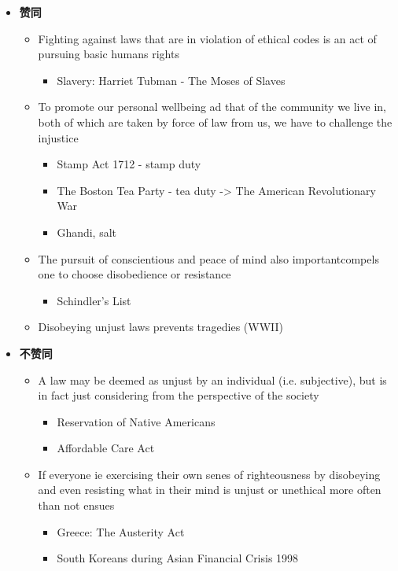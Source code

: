 \documentclass{article}
\begin{document}
  \begin{itemize}
    \item \textbf{赞同}
    \begin{itemize}
      \item Fighting against laws that are in violation of ethical codes
      is an act of pursuing basic humans rights
      \begin{itemize}
        \item Slavery: Harriet Tubman - The Moses of Slaves
      \end{itemize}

      \item To promote our personal wellbeing ad that of the community we
      live in, both of which are taken by force of law from us, we have to
      challenge the injustice
      \begin{itemize}
        \item Stamp Act 1712 - stamp duty
        \item The Boston Tea Party - tea duty -> The American
        Revolutionary War
        \item Ghandi, salt
      \end{itemize}

      \item The pursuit of conscientious and peace of mind also
      important{compels one to choose disobedience or resistance}
      \begin{itemize}
        \item Schindler’s List
      \end{itemize}

      \item Disobeying unjust laws prevents tragedies (WWII)
    \end{itemize}

    \item \textbf{不赞同}
    \begin{itemize}
      \item A law may be deemed as unjust by an individual
      (i.e. subjective), but is in fact just considering from the
      perspective of the society
      \begin{itemize}
        \item Reservation of Native Americans
        \item Affordable Care Act
      \end{itemize}

      \item If everyone ie exercising their own senes of righteousness by
      disobeying and even resisting what in their mind is unjust or
      unethical  more often than not ensues
      \begin{itemize}
        \item Greece: The Austerity Act
        \item South Koreans during Asian Financial Crisis 1998
      \end{itemize}


\end{itemize}
\end{itemize}
\end{document}
